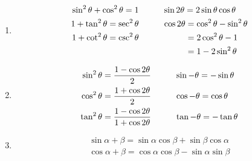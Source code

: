 \documentclass[10pt]{article}
\begin{document}
\begin{multicols}{2}
\begin{enumerate}
\begin{enumerate}
        \item     
        \begin{align*}
            \sin^2{\theta} + \cos^2{\theta} = 1 \hspace{10mm} & \sin{2\theta} = 2\sin{\theta}\cos{\theta} \\
            1 + \tan^2{\theta} = \sec^2{\theta} \hspace{10mm} & \cos{2\theta} = \cos^2{\theta} - \sin^2{\theta} \\
            1 + \cot^2{\theta} = \csc^2{\theta} \hspace{10mm} & \hspace{9.4mm} = 2\cos^2{\theta} - 1 \\
         \hspace{10mm} & \hspace{9.4mm} = 1 - 2\sin^2{\theta} 
        \end{align*}
        
        
        \item     
        \begin{align*}
            \sin^2{\theta} = \frac{1-\cos{2\theta}}{2} & \hspace{10mm} \sin{-\theta} = -\sin{\theta} \\
            \cos^2{\theta} = \frac{1 + \cos{2\theta}}{2} & \hspace{10mm} \cos{-\theta} = \cos{\theta} \\
            \tan^2{\theta} = \frac{1-\cos{2\theta}}{1+\cos{2\theta}} & \hspace{10mm} \tan{-\theta} = -\tan{\theta} 
        \end{align*}

        \item 
        \begin{align*}
            \sin{\alpha + \beta} = \sin{\alpha}\cos{\beta} + \sin{\beta}\cos{\alpha} \\
            \cos{\alpha + \beta} = \cos{\alpha}\cos{\beta} - \sin{\alpha}\sin{\beta} 
        \end{align*}
    \end{enumerate}
    

\end{enumerate}
\end{multicols}
\end{document}
